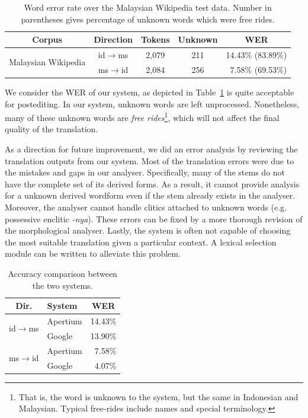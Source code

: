 \documentclass[10pt,a5paper,twoside]{article}
\begin{document}
\begin{table}[htbp]
  \begin{center}
  \begin{tabular}{ccccr}
  \toprule
  \bf{Corpus}                 & \bf{Direction}         & \bf{Tokens}  & \bf{Unknown} & \multicolumn{1}{c}{\bf{WER}}  \\
  \midrule
  \multirow{2}{*}{Malaysian Wikipedia} & id$\rightarrow$ms & 2,079     & 211  & 14.43\% (83.89\%) \\
                          & ms$\rightarrow$id & 2,084     & 256  & 7.58\% (69.53\%)  \\
  \bottomrule
  \end{tabular}
    \caption{Word error rate over the Malaysian Wikipedia test data. Number in parentheses gives percentage of unknown words which were free rides.}
    \label{table:wer}
  \end{center}
\end{table}

We consider the WER of our system, as depicted in Table~\ref{table:wer} is quite acceptable for postediting. In our system, unknown words are left unprocessed. Nonetheless, many of these unknown words are \emph{free rides}\footnote{That is, the word is unknown to the system, but the same in Indonesian and Malaysian. Typical free-rides include names and special terminology.}, which will not affect the final quality of the translation.

As a direction for future improvement, we did an error analysis by reviewing the translation outputs from our system. Most of the translation errors were due to the mistakes and gaps in our analyser. Specifically, many of the stems do not have the complete set of its derived forms. As a result, it cannot provide analysis for a unknown derived wordform even if the stem already exists in the analyser. Moreover, the analyser cannot handle clitics attached to unknown words (e.g. possessive enclitic \emph{-nya}). These errors can be fixed by a more thorough revision of the morphological analyser. Lastly, the system is often not capable of choosing the most suitable translation given a particular context. A lexical selection module can be written to alleviate this problem.
\begin{table}[htbp]
  \begin{center}
  \begin{tabular}{clr}
  \toprule
  \bf{Dir.}                 & \bf{System}         & \multicolumn{1}{c}{\bf{WER}}  \\
  \midrule
  \multirow{2}{*}{id$\rightarrow$ms} & Apertium & 14.43\% \\
                                     & Google & 13.90\% \\
  \midrule
  \multirow{2}{*}{ms$\rightarrow$id} & Apertium & 7.58\% \\
                                     & Google & 4.07\% \\
  \bottomrule
  \end{tabular}
    \caption{Accuracy comparison between the two systems.}
    \label{table:comp}
  \end{center}
\end{table}
\end{document}

